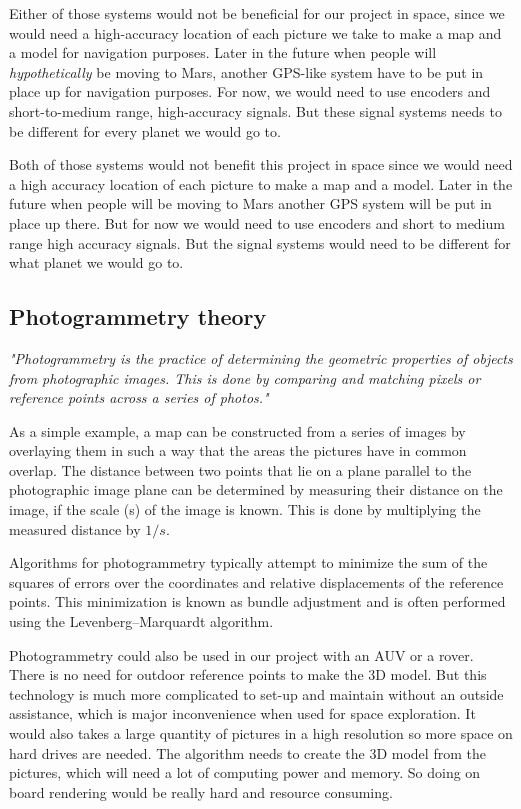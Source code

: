 Either of those systems would not be beneficial for our project in space, since we would need a high-accuracy location of each picture we take to make a map and a model for navigation purposes. Later in the future when people will \textit{hypothetically} be moving to Mars, another GPS-like system have to be put in place up for navigation purposes. For now, we would need to use encoders and short-to-medium range, high-accuracy signals. But these signal systems needs to be different for every planet we would go to. 

Both of those systems would not benefit this project in space since we would need a high accuracy location of each picture to make a map and a model. Later in the future when people will be moving to Mars another GPS system will be put in place up there. But for now we would need to use encoders and short to medium range high accuracy signals. But the signal systems would need to be different for what planet we would go to. 

\subsection{Photogrammetry theory}

\textit{"Photogrammetry is the practice of determining the geometric properties of objects from
	photographic images. This is done by comparing and matching pixels or reference points across a series
	of photos."\cite{Photogrammetry}}

As a simple example, a map can be constructed from a series of images by overlaying them in such a way that the areas the pictures have in common overlap. The distance between two points that lie on a plane parallel to the photographic image plane can be determined by measuring their distance on the image, if the scale (s) of the image is known. This is done by multiplying the measured distance by $1/s$\cite{photo}.

Algorithms for photogrammetry typically attempt to minimize the sum of the squares of errors over the coordinates and relative displacements of the reference points. This minimization is known as bundle adjustment and is often performed using the Levenberg–Marquardt algorithm\cite{photo}.

Photogrammetry could also be used in our project with an AUV or a rover. There is no need for outdoor reference points to make the 3D model. But this technology is much more complicated to set-up and maintain without an outside assistance, which is major inconvenience when used for space exploration. It would also takes a large quantity of pictures in a high resolution so more space on hard drives are needed. The algorithm needs to create the 3D model from the pictures, which will need a lot of computing power and memory. So doing on board rendering would be really hard and resource consuming.


